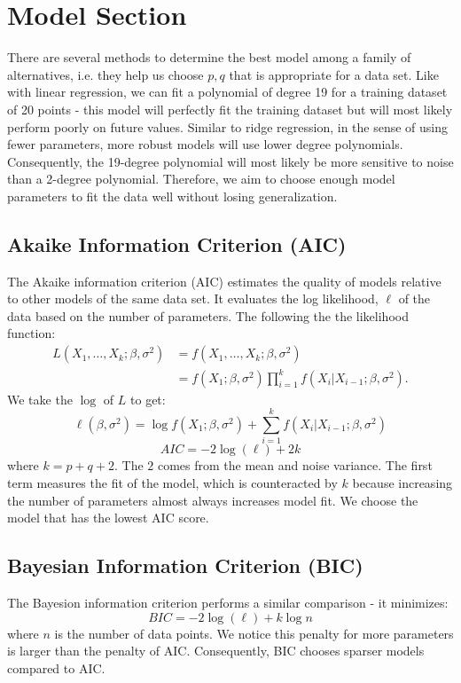 \documentclass{article}
\begin{document}
\section{Model Section}
There are several methods to determine the best model among a family of alternatives, i.e. they help us choose $p, q$ that is appropriate for a data set. Like with linear regression, we can fit a polynomial of degree 19 for a training dataset of 20 points - this model will perfectly fit the training dataset but will most likely perform poorly on future values. Similar to ridge regression, in the sense of using fewer parameters, more robust models will use lower degree polynomials. Consequently, the 19-degree polynomial will most likely be more sensitive to noise than a 2-degree polynomial. Therefore, we aim to choose enough model parameters to fit the data well without losing generalization.
\subsection{Akaike Information Criterion (AIC)}
The Akaike information criterion (AIC) estimates the quality of models relative to other models of the same data set. It evaluates the log likelihood, $\ell$ of the data based on the number of parameters. The following the the likelihood function:
\begin{align}\label{mle likelihood}
    L(X_1, \ldots, X_k; \beta, \sigma^2)&=f(X_1, \ldots, X_k; \beta, \sigma^2) \nonumber\\
    &= f(X_1;\beta, \sigma^2)\prod_{i=1}^k f(X_i|X_{i-1};\beta, \sigma^2).
\end{align}
We take the $\log$ of $L$ to get:
\begin{equation}\label{log likelihood}
    \ell(\beta, \sigma^2) = \log f(X_1;\beta, \sigma^2) + \sum_{i=1}^k f(X_i|X_{i-1}; \beta, \sigma^2)
\end{equation}
\begin{equation}
    AIC = -2\log(\ell)+2k
\end{equation}
where $k=p+q+2$. The $2$ comes from the mean and noise variance. The first term measures the fit of the model, which is counteracted by $k$ because increasing the number of parameters almost always increases model fit. We choose the model that has the lowest AIC score.
\subsection{Bayesian Information Criterion (BIC)}
The Bayesion information criterion performs a similar comparison - it minimizes:
\begin{equation}
    BIC =-2\log(\ell) + k\log n
\end{equation}
where $n$ is the number of data points. We notice this penalty for more parameters is larger than the penalty of AIC. Consequently, BIC chooses sparser models compared to AIC.
\end{document}
